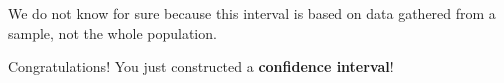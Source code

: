 \documentclass[noanswers]{exam}
\begin{document}
\begin{questions}
	\begin{solution}[\stretch{1}]
	
	\vspace{1mm}

	We do not know for sure because this interval is based on data gathered from a sample, not the whole population. 
	
	\end{solution}
	
	Congratulations! You just constructed a \textbf{confidence interval}!
	
\end{questions}
\end{document}
